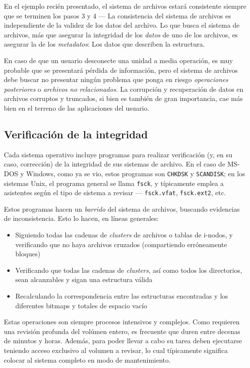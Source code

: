 \documentclass[11pt,fleqn]{book} %
\begin{document}
En el ejemplo recién presentado, el sistema de archivos
estará consistente siempre que se terminen los pasos 3 y 4 — La
consistencia del sistema de archivos es independiente de la validez de
los datos del archivo. Lo que busca el sistema de archivos, más que
asegurar la integridad de los \emph{datos} de uno de los archivos, es
asegurar la de los \emph{metadatos}: Los datos que describen la
estructura.

En caso de que un usuario desconecte una unidad a media
operación, es muy probable que se presentará pérdida de información,
pero el sistema de archivos debe buscar no presentar ningún problema
que ponga en riesgo \emph{operaciones posteriores} o \emph{archivos no relacionados}. La corrupción y recuperación de datos en archivos
corruptos y truncados, si bien es también de gran importancia, cae más
bien en el terreno de las aplicaciones del usuario.
\subsection{Verificación de la integridad}
\label{sec-7-3-2}


Cada sistema operativo incluye programas para realizar verificación
(y, en su caso, corrección) de la integridad de sus sistemas de
archivo. En el caso de MS-DOS y Windows, como ya se vio, estos
programas son \texttt{CHKDSK} y \texttt{SCANDISK}; en los sistemas Unix, el programa
general se llama \texttt{fsck}, y típicamente emplea a asistentes según el
tipo de sistema a revisar — \texttt{fsck.vfat}, \texttt{fsck.ext2}, etc.

Estos programas hacen un \emph{barrido} del sistema de archivos, buscando
evidencias de inconsistencia. Esto lo hacen, en líneas generales:

\begin{itemize}
\item Siguiendo todas las cadenas de \emph{clusters} de archivos o tablas de
  i-nodos, y verificando que no haya archivos cruzados (compartiendo
  erróneamente bloques)
\item Verificando que todas las cadenas de \emph{clusters}, así como todos los
  directorios, sean alcanzables y sigan una estructura válida
\item Recalculando la correspondencia entre las estructuras encontradas y
  los diferentes bitmaps y totales de espacio vacío
\end{itemize}

Estas operaciones son siempre procesos intensivos y complejos. Como
requieren una revisión profunda del volúmen entero, es frecuente que
duren entre decenas de minutos y horas. Además, para poder llevar a
cabo su tarea deben ejecutarse teniendo acceso exclusivo al volumen a
revisar, lo cual típicamente significa colocar al sistema completo en
modo de mantenimiento.
\end{document}

